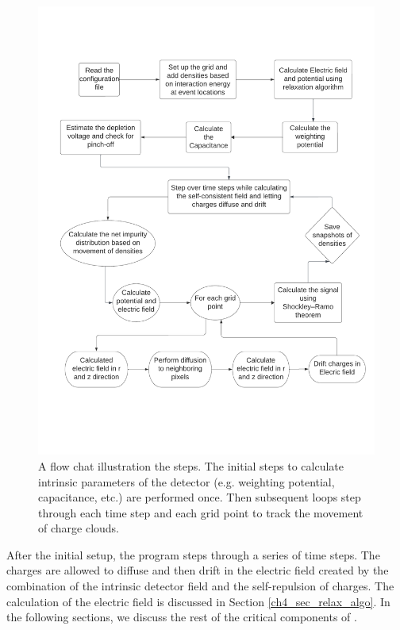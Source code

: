 \begin{figure}[!htb]
\centering
\includegraphics[width=0.99\linewidth,trim={2pc 10pc 1.5pc 9pc},clip]{ch3/figs/ehd_flowchart.pdf}
\caption{A flow chat illustration the {\ehd} steps. The initial steps to calculate intrinsic parameters of the detector (e.g. weighting potential, capacitance, etc.) are performed once. Then subsequent loops step through each time step and each grid point to track the movement of charge clouds.}
\label{fig:ehd_flowchart}
\end{figure}

After the initial setup, the program steps through a series of time steps. The charges are allowed to diffuse and then drift in the electric field created by the combination of the intrinsic detector field and the self-repulsion of charges. The calculation of the electric field is discussed in Section \ref{ch4_sec_relax_algo}. In the following sections, we discuss the rest of the critical components of {\ehd}.

